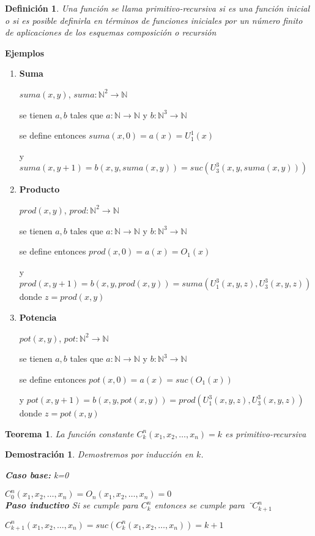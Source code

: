 \documentclass[a4paper,1pt]{report}
\newtheorem*{teo}{Teorema}
\newtheorem*{dem}{Demostración}
\newtheorem*{dfn}{Definición}
\begin{document}
\begin{dfn}
 Una función se llama primitivo-recursiva si es una función inicial o si es posible definirla en términos de funciones iniciales por un número finito de aplicaciones de los esquemas composición o recursión
\end{dfn}

\textbf{Ejemplos}

\begin{enumerate}
 \item \textbf{Suma}
 
 $suma(x,y)$, $suma:\mathbb{N}^2\rightarrow\mathbb{N}$
 
 se tienen $a,b$ tales que $a:\mathbb{N}\rightarrow\mathbb{N}$ y $b:\mathbb{N}^3\rightarrow\mathbb{N}$
 
 se define entonces $suma(x,0)=a(x)=U^1_1(x)$
 
 y $suma(x,y+1)=b(x,y,suma(x,y))=suc(U^3_3(x,y,suma(x,y)))$
 
 \item \textbf{Producto}
 
 $prod(x,y)$, $prod:\mathbb{N}^2\rightarrow\mathbb{N}$
 
 se tienen $a,b$ tales que $a:\mathbb{N}\rightarrow\mathbb{N}$ y $b:\mathbb{N}^3\rightarrow\mathbb{N}$
 
 se define entonces $prod(x,0)=a(x)=O_1(x)$
 
 y $prod(x,y+1)=b(x,y,prod(x,y))=suma(U^3_1(x,y,z),U^3_3(x,y,z))$ donde $z=prod(x,y)$
 
 \item \textbf{Potencia}
 
 $pot(x,y)$, $pot:\mathbb{N}^2\rightarrow\mathbb{N}$
 
 se tienen $a,b$ tales que $a:\mathbb{N}\rightarrow\mathbb{N}$ y $b:\mathbb{N}^3\rightarrow\mathbb{N}$
 
 se define entonces $pot(x,0)=a(x)=suc(O_1(x))$
 
 y $pot(x,y+1)=b(x,y,pot(x,y))=prod(U^3_1(x,y,z),U^3_3(x,y,z))$ donde $z=pot(x,y)$
 
\end{enumerate}

\begin{teo}
La función constante $C^n_k(x_1,x_2,\dots,x_n)=k$ es primitivo-recursiva
\end{teo}

\begin{dem}
 Demostremos por inducción en $k$.
 
 \textbf{Caso base:} k=0
 
 $C^n_0(x_1,x_2,\dots,x_n)=O_n(x_1,x_2,\dots,x_n)=0$\\
 
 \textbf{Paso inductivo} Si se cumple para $C^n_k$ entonces se cumple para ¨$C^n_{k+1}$
 
  $C^n_{k+1}(x_1,x_2,\dots,x_n)=suc(C^n_k(x_1,x_2,\dots,x_n))=k+1$
\end{dem}
\end{document}

